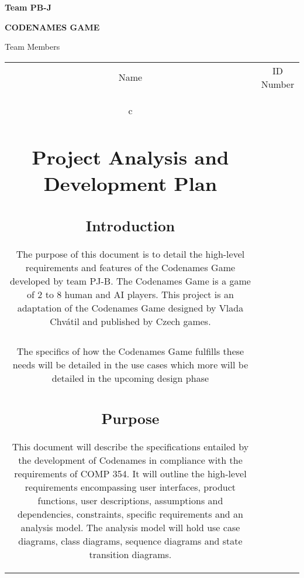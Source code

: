 \documentclass[10pt, a4paper]{article}
\begin{document}
	
\hrulefill
\begin{flushright}
\textbf{Team PB-J}
\end{flushright}
\hrulefill

\vspace*{0.5in}
\centerline{\bf\Large CODENAMES GAME}

\vspace*{1.5in}


\begin{table}[htbp]
	
\begin{center}
    \begin{center}
	    Team Members\\
    \end{center}

	\begin{tabular}{| c | c |}
		\hline
		Name & ID Number \\c
\tableofcontents

\newpage

\section{Project Analysis and Development Plan}

	\subsection{Introduction}
	
	 The purpose of this document is to detail the high-level requirements and features of the Codenames Game developed by team PJ-B. The Codenames Game is a game of 2 to 8 human and AI players. This project is an adaptation of the Codenames Game designed by Vlada Chv\'atil and published by Czech games.\\
	 \\
	 The specifics of how the Codenames Game fulfills these needs will be detailed in the use cases which more will be detailed in the upcoming design phase\\
	
	\subsection{Purpose}
	
	This document will describe the specifications entailed by the development of Codenames in compliance with the requirements of COMP 354. It will outline the high-level requirements encompassing user interfaces, product functions, user descriptions, assumptions and dependencies, constraints, specific requirements and an analysis model. The analysis model will hold use case diagrams, class diagrams, sequence diagrams and state transition diagrams.
	

\end{tabular}
\end{center}
\end{table}
\end{document}
